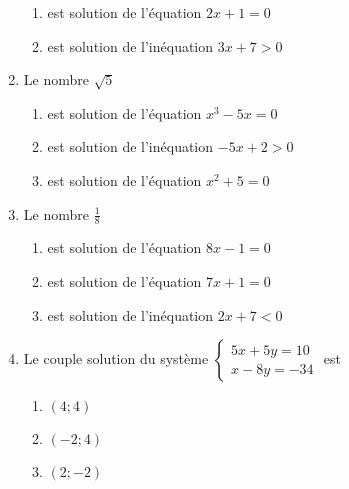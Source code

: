 \documentclass[oneside,twoside]{book}
\begin{document}
\begin{enumerate}
\begin{enumerate}
\item\MauvaiseReponse est solution de l'équation $2x+1=0$


\item\BonneReponse est solution de l'inéquation $3x+7>0$

\end{enumerate}



\item Le nombre $\sqrt{5}$

\begin{enumerate}


\item\BonneReponse est solution de l'équation $x^{3}-5x=0$

\item\MauvaiseReponse est solution de l'inéquation $-5x+2>0$

\item\MauvaiseReponse est solution de l'équation $x^{2}+5=0$

\end{enumerate}



\item Le nombre $\frac{1}{8}$

\begin{enumerate}


\item\BonneReponse est solution de l'équation $8x-1=0$

\item\MauvaiseReponse est solution de l'équation $7x+1=0$

\item\MauvaiseReponse est solution de l'inéquation $2x+7<0$

\end{enumerate}


\newpage

\item Le couple solution du système $\left\{\begin{array}{c}5x+5y=10 \\ x-8y=-34\end{array}\right.$ est

\begin{enumerate}

\item\MauvaiseReponse $(4;4)$

\item\BonneReponse $(-2 ;4)$

\item\MauvaiseReponse $(2 ; -2)$



\end{enumerate}
\end{enumerate}
\end{document}
